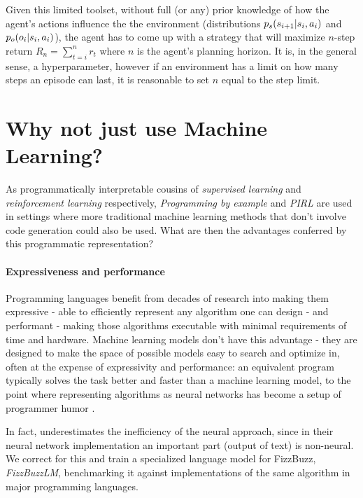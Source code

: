 Given this limited toolset, without full (or any) prior knowledge of how the agent's actions influence the the environment (distributions $p_s(s_{i+1} | s_i, a_i)$ and $p_o(o_i | s_i, a_i)$), the agent has to come up with a strategy that will maximize $n$-step return $R_n=\sum_{t=i}^{n} r_t$ where $n$ is the agent's planning horizon. It is, in the general sense, a hyperparameter, however if an environment has a limit on how many steps an episode can last, it is reasonable to set $n$ equal to the step limit. 

\newpage
\section{Why not just use Machine Learning?}

As programmatically interpretable cousins of \emph{supervised learning} and \emph{reinforcement learning} respectively, \emph{Programming by example} and \emph{PIRL} are  used in settings where more traditional machine learning methods that don't involve code generation could also be used.
What are then the advantages conferred by this programmatic representation?

\paragraph{Expressiveness and performance}

Programming languages benefit from decades of research into making them \textcolor{accent}{expressive} - able to efficiently represent any algorithm one can design - and \textcolor{accent}{performant} - making those algorithms executable with minimal requirements of time and hardware.
Machine learning models don't have this advantage - they are designed to make the space of possible models easy to search and optimize in, often at the expense of expressivity and performance: an equivalent program typically solves the task better and faster than a machine learning model, to the point where representing algorithms as neural networks has become a setup of programmer humor \cite{JoelGrusFizz}.

In fact, \cite{JoelGrusFizz} underestimates the inefficiency of the neural approach, since in their neural network implementation an important part (output of text) is non-neural.
We correct for this and train a specialized language model for FizzBuzz, \emph{FizzBuzzLM}, benchmarking it against implementations of the same algorithm in major programming languages.

